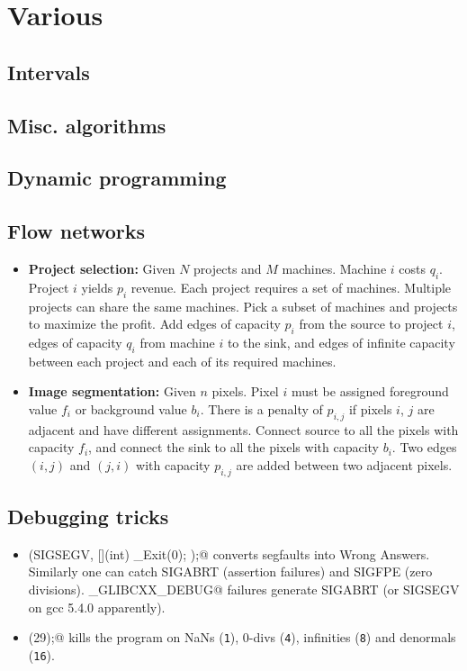 \chapter{Various}

\section{Intervals}

\section{Misc. algorithms}

\section{Dynamic programming}

\section{Flow networks}
	\begin{itemize}
		\item \textbf{Project selection:} Given $N$ projects and $M$ machines. Machine $i$ costs $q_i$. Project $i$ yields $p_i$ revenue. Each project requires a set of machines. Multiple projects can share the same machines. Pick a subset of machines and projects to maximize the profit. Add edges of capacity $p_i$ from the source to project $i$, edges of capacity $q_i$ from machine $i$ to the sink, and edges of infinite capacity between each project and each of its required machines.
		\item \textbf{Image segmentation:} Given $n$ pixels. Pixel $i$ must be assigned foreground value $f_i$ or background value $b_i$. There is a penalty of $p_{i,j}$ if pixels $i$, $j$ are adjacent and have different assignments. Connect source to all the pixels with capacity $f_i$, and connect the sink to all the pixels with capacity $b_i$. Two edges $(i, j)$ and $(j, i)$ with capacity $p_{i,j}$ are added between two adjacent pixels.
	\end{itemize}

\section{Debugging tricks}
	\begin{itemize}
		\item \verb@signal(SIGSEGV, [](int) { _Exit(0); });@ converts segfaults into Wrong Answers.
			Similarly one can catch SIGABRT (assertion failures) and SIGFPE (zero divisions).
			\verb@_GLIBCXX_DEBUG@ failures generate SIGABRT (or SIGSEGV on gcc 5.4.0 apparently).
		\item \verb@feenableexcept(29);@ kills the program on NaNs (\texttt 1), 0-divs (\texttt 4), infinities (\texttt 8) and denormals (\texttt{16}).
	\end{itemize}

